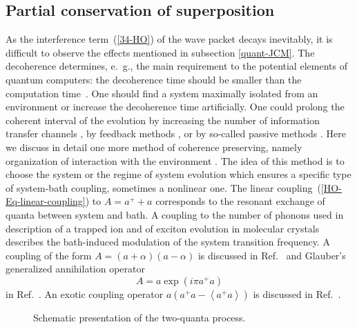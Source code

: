 \documentclass[12pt,twoside,a4paper]{report}
\begin{document}
\subsection{Partial conservation of superposition\label{quant-conserv}}
As the interference term~(\ref{34-HO}) of the wave packet decays inevitably,
it is difficult to observe the effects mentioned in subsection \ref{quant-JCM}.
The decoherence determines, e.~g., the main requirement to the potential
elements of quantum computers: the decoherence time should be smaller
than the computation time~\cite{stea98}.  
One should find a system maximally
isolated from an environment or increase the decoherence time
artificially.  One could prolong the coherent interval of the evolution by
increasing the number of information transfer channels \cite{eker95},
by feedback methods \cite{horo98}, or by so-called passive methods
\cite{zana97}.  Here we discuss in detail one more method of
coherence preserving, namely organization of interaction with 
the environment \cite{2,filh96,poya96}.  The idea of this method is to choose
the  system or the  regime of system evolution which ensures
a specific type of system-bath coupling, sometimes a nonlinear one.
The linear coupling~(\ref{HO-Eq-linear-coupling}) to $A=a^+ +a$ corresponds to the
resonant exchange of quanta between system and bath.  A coupling 
to the number of phonons used in description of a trapped ion
\cite{poya96} and of exciton evolution in molecular
crystals \cite{rein82} describes the bath-induced modulation of the
system transition frequency.  A coupling of the
form $ A=(a+\alpha)(a-\alpha)$
is discussed in Ref.~\cite{filh96} and
Glauber's generalized annihilation operator \cite{titu63,yurk86}
\begin{equation}
\label{Yurke}
A
   =
      a\exp{
          \left(  
             {{i}}\pi a^+a  
          \right)}
\end{equation}
in Ref.~\cite{horo98}.
An exotic coupling operator 
$a\left(
      a^+ a
   -  \left\langle
          a^+ a
      \right\rangle
  \right)$
is discussed in
Ref.~\cite{poya96}.
\footnotesize\begin{figure}[!h]\centering
  \parbox{10cm}
  {\rule{0cm}{0cm}
\epsfxsize=10cm}
\caption[Two-quanta process]
{\small  Schematic presentation of the two-quanta process.
\label{schem-Full2}
}
\end{figure}\normalsize
\end{document}
